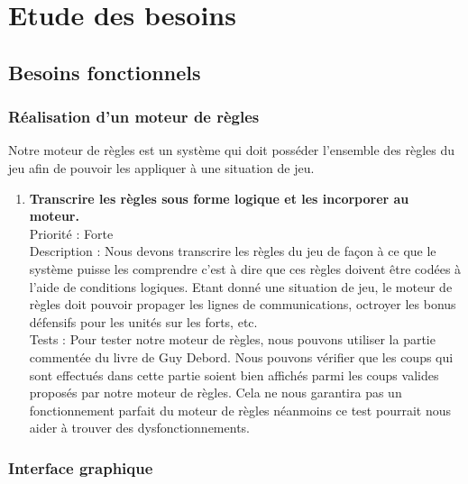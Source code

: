 \chapter{Etude des besoins}

	\section{Besoins fonctionnels}

		\subsection{Réalisation d'un moteur de règles}

			Notre moteur de règles est un système qui doit posséder l'ensemble des règles du jeu afin de pouvoir les appliquer à une situation de jeu.

			\begin{enumerate}

				\item \textbf{Transcrire les règles sous forme logique et les incorporer au moteur.} 
				\\[0.7\baselineskip]
				Priorité : Forte 
				\\[0.7\baselineskip]
				Description : Nous devons transcrire les règles du jeu de façon à ce que le système puisse les comprendre c'est à dire que ces 
				règles doivent être codées à l'aide de conditions logiques. Etant donné une situation de jeu, le moteur de règles doit pouvoir 
				propager les lignes de communications, octroyer les bonus défensifs pour les unités sur les forts, etc.
				\\[0.7\baselineskip]
				Tests : Pour tester notre moteur de règles, nous pouvons utiliser la partie commentée du livre de Guy Debord. Nous pouvons 
				vérifier que les coups qui sont effectués dans cette partie soient bien affichés parmi les coups valides proposés par notre 
				moteur de règles. Cela ne nous garantira pas un fonctionnement parfait du moteur de règles néanmoins ce test pourrait nous 
				aider à trouver des dysfonctionnements. 
				\\[0.7\baselineskip]
				
			\end{enumerate}

		\subsection{Interface graphique}

